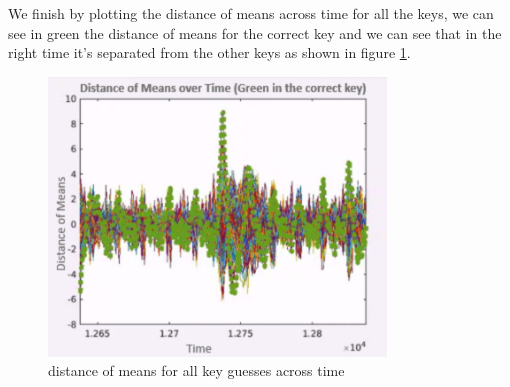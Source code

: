We finish by plotting the distance of means across time for all the keys, we can see in green the distance of means for the correct key and we can see that in the right time it's separated from the other keys as shown in figure \ref{fig:all}.
\begin{figure}[H]
\centering
\includegraphics[width=0.8\textwidth]{images/Lecture6/all.png}
\caption{distance of means for all key guesses across time}
\label{fig:all}
\end{figure}
